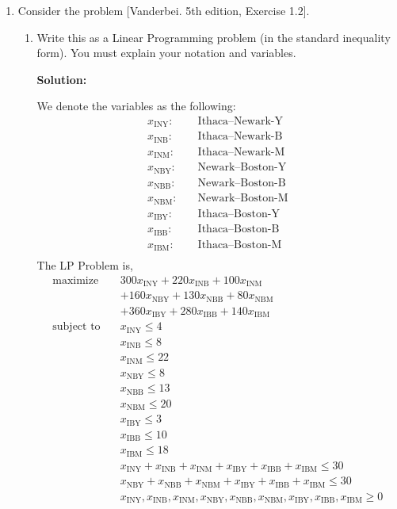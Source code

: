 \documentclass[11pt]{article}
\newenvironment{solution}
  {\par\noindent\textbf{Solution:}\par}
  {\par}
\begin{document}
\begin{enumerate}
\begin{enumerate}[label=(\alph*)]
\end{enumerate}
\item Consider the problem [Vanderbei. 5th edition, Exercise 1.2].
  \begin{enumerate}[label=(\alph*)]
    \item Write this as a Linear Programming problem (in the standard inequality form).
You must explain your notation and variables.
    \begin{solution}
      We denote the variables as the following: 
      \[
        \begin{aligned}
          x_\text{INY}:\quad & \text{Ithaca–Newark-Y}\\ 
          x_\text{INB}:\quad & \text{Ithaca–Newark-B}\\ 
          x_\text{INM}:\quad & \text{Ithaca–Newark-M}\\ 
          x_\text{NBY}:\quad & \text{Newark–Boston-Y}\\ 
          x_\text{NBB}:\quad & \text{Newark–Boston-B}\\ 
          x_\text{NBM}:\quad & \text{Newark–Boston-M}\\ 
          x_\text{IBY}:\quad & \text{Ithaca–Boston-Y}\\ 
          x_\text{IBB}:\quad & \text{Ithaca–Boston-B}\\ 
          x_\text{IBM}:\quad & \text{Ithaca–Boston-M}\\ 
        \end{aligned}
      \]
      The LP Problem is,
      \[
      \begin{aligned}
          \text{maximize} \quad &300  x_\text{INY}+ 220x_\text{INB} + 100  x_\text{INM} \\ 
                    & + 160 x_\text{NBY} + 130 x_\text{NBB}+ 80 x_\text{NBM} \\ 
                    & + 360  x_\text{IBY}+ 280 x_\text{IBB}+ 140 x_\text{IBM}\\
          \text{subject to} \quad 
          & x_\text{INY} \le 4 \\ 
          & x_\text{INB} \le 8 \\ 
          & x_\text{INM} \le 22 \\ 
          & x_\text{NBY} \le 8 \\ 
          & x_\text{NBB} \le 13 \\
          & x_\text{NBM} \le 20 \\ 
          & x_\text{IBY} \le 3 \\ 
          & x_\text{IBB} \le 10 \\ 
          & x_\text{IBM} \le 18\\
          & x_\text{INY} + x_\text{INB} + x_\text{INM} +  x_\text{IBY} +x_\text{IBB} + x_\text{IBM} \le 30\\        
          & x_\text{NBY} +  x_\text{NBB} + x_\text{NBM} + x_\text{IBY} + x_\text{IBB} + x_\text{IBM} \le 30 \\ 
          & x_\text{INY},x_\text{INB},x_\text{INM},x_\text{NBY},x_\text{NBB},x_\text{NBM} ,x_\text{IBY} ,x_\text{IBB} ,x_\text{IBM} \ge 0
        \end{aligned}
      \]


\end{solution}
\end{enumerate}
\end{enumerate}
\end{document}
